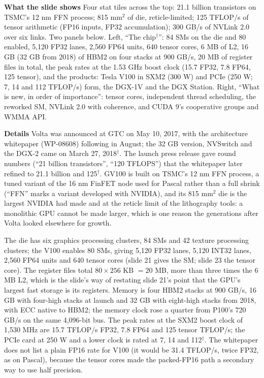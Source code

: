 \documentclass[11pt,letterpaper]{article}
\newcommand{\para}[1]{\medskip\noindent\textbf{#1}\quad}
\begin{document}
\para{What the slide shows} Four stat tiles across the top: 21.1 billion transistors on TSMC's 12 nm FFN process; 815 mm$^2$ of die, reticle-limited; 125 TFLOP/s of tensor arithmetic (FP16 inputs, FP32 accumulation); 300 GB/s of NVLink 2.0 over six links. Two panels below. Left, ``The chip$^\dagger$'': 84 SMs on the die and 80 enabled, 5,120 FP32 lanes, 2,560 FP64 units, 640 tensor cores, 6 MB of L2, 16 GB (32 GB from 2018) of HBM2 on four stacks at 900 GB/s, 20 MB of register files in total, the peak rates at the 1.53 GHz boost clock (15.7 FP32, 7.8 FP64, 125 tensor), and the products: Tesla V100 in SXM2 (300 W) and PCIe (250 W; 7, 14 and 112 TFLOP/s) form, the DGX-1V and the DGX Station. Right, ``What is new, in order of importance'': tensor cores, independent thread scheduling, the reworked SM, NVLink 2.0 with coherence, and CUDA 9's cooperative groups and WMMA API.

\para{Details} Volta was announced at GTC on May 10, 2017, with the architecture whitepaper (WP-08608) following in August; the 32 GB version, NVSwitch and the DGX-2 came on March 27, 2018$^\dagger$. The launch press release gave round numbers (``21 billion transistors'', ``120 TFLOPS'') that the whitepaper later refined to 21.1 billion and 125$^\dagger$. GV100 is built on TSMC's 12 nm FFN process, a tuned variant of the 16 nm FinFET node used for Pascal rather than a full shrink (``FFN'' marks a variant developed with NVIDIA), and its 815 mm$^2$ die is the largest NVIDIA had made and at the reticle limit of the lithography tools: a monolithic GPU cannot be made larger, which is one reason the generations after Volta looked elsewhere for growth.

The die has six graphics processing clusters, 84 SMs and 42 texture processing clusters; the V100 enables 80 SMs, giving 5,120 FP32 lanes, 5,120 INT32 lanes, 2,560 FP64 units and 640 tensor cores (slide 21 gives the SM; slide 23 the tensor core). The register files total $80 \times 256$ KB $= 20$ MB, more than three times the 6 MB L2, which is the slide's way of restating slide 21's point that the GPU's largest fast storage is its registers. Memory is four HBM2 stacks at 900 GB/s, 16 GB with four-high stacks at launch and 32 GB with eight-high stacks from 2018, with ECC native to HBM2; the memory clock rose a quarter from P100's 720 GB/s on the same 4,096-bit bus. The peak rates at the SXM2 boost clock of 1,530 MHz are 15.7 TFLOP/s FP32, 7.8 FP64 and 125 tensor TFLOP/s; the PCIe card at 250 W and a lower clock is rated at 7, 14 and 112$^\dagger$. The whitepaper does not list a plain FP16 rate for V100 (it would be 31.4 TFLOP/s, twice FP32, as on Pascal), because the tensor cores made the packed-FP16 path a secondary way to use half precision.
\end{document}
